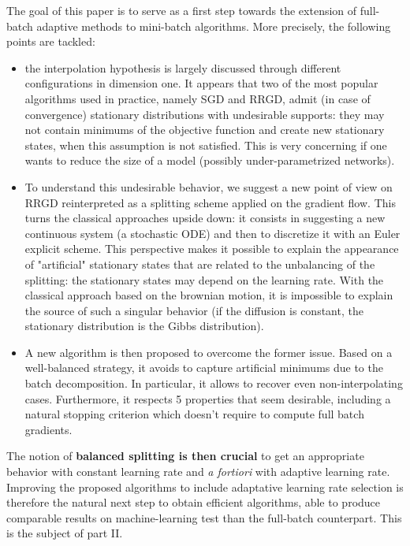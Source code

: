 The goal of this paper is to serve as a first step towards the extension of full-batch adaptive methods \cite{Bilel} to mini-batch algorithms.
More precisely, the following points are tackled:
\begin{itemize}
	\item the interpolation hypothesis is largely discussed through different configurations in dimension one. It appears that two of the most popular algorithms used in practice, namely SGD and RRGD, admit (in case of convergence) stationary distributions with undesirable supports: they may not contain minimums of the objective function and create new stationary states, when this assumption is not satisfied. This is very concerning if one wants to reduce the size of a model (possibly under-parametrized networks).
	\item To understand this undesirable behavior, we suggest a new point of view on RRGD reinterpreted as a splitting scheme applied on the gradient flow. This turns the classical approaches upside down: it consists in suggesting a new continuous system (a stochastic ODE) and then to discretize it with an Euler explicit scheme. This perspective makes it possible to explain the appearance of "artificial" stationary states that are related to the unbalancing of the splitting: the stationary states may depend on the learning rate. With the classical approach based on the brownian motion, it is impossible to explain the source of such a singular behavior (if the diffusion is constant, the stationary distribution is the Gibbs distribution).
         \item A new algorithm is then proposed to overcome the former issue. Based on a well-balanced strategy, it avoids to capture artificial minimums due to the batch decomposition. In particular, it allows to recover even non-interpolating cases. Furthermore, it respects 5 properties that seem desirable, including a natural stopping criterion which doesn't require to compute full batch gradients.
\end{itemize}

The notion of \textbf{balanced splitting is then crucial} to get an appropriate behavior with constant learning rate and {\em a fortiori} with adaptive learning rate. Improving the proposed algorithms to include adaptative learning rate selection is therefore the natural next step to obtain efficient algorithms, able to produce comparable results on machine-learning test than the full-batch counterpart. This is the subject of part II.




